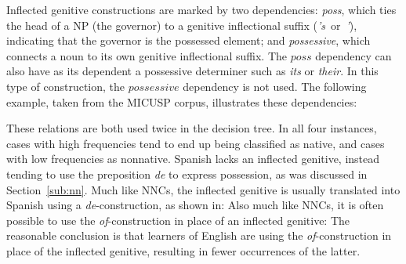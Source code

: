 \documentclass[main.tex]{subfiles}
\begin{document}
Inflected genitive constructions are marked by two dependencies: \textit{poss}, which ties the head of a NP (the governor) to a genitive inflectional suffix (\textit{'s}~or~\textit{'}), indicating that the governor is the possessed element; and \textit{possessive}, which connects a noun to its own genitive inflectional suffix. The $poss$ dependency can also have as its dependent a possessive determiner such as \textit{its} or \textit{their}. In this type of construction, the $possessive$ dependency is not used. The following example, taken from the MICUSP corpus, illustrates these dependencies:
\newline\newline{}
\newline

These relations are both used twice in the decision tree. In all four instances, cases with high frequencies tend to end up being classified as native, and cases with low frequencies as nonnative. Spanish lacks an inflected genitive, instead tending to use the preposition \textit{de} to express possession, as was discussed in Section~\ref{sub:nn}. Much like NNCs, the inflected genitive is usually translated into Spanish using a \textit{de}-construction, as shown in:
Also much like NNCs, it is often possible to use the \textit{of}-construction in place of an inflected genitive:
The reasonable conclusion is that learners of English are using the \textit{of}-construction in place of the inflected genitive, resulting in fewer occurrences of the latter.
\end{document}
